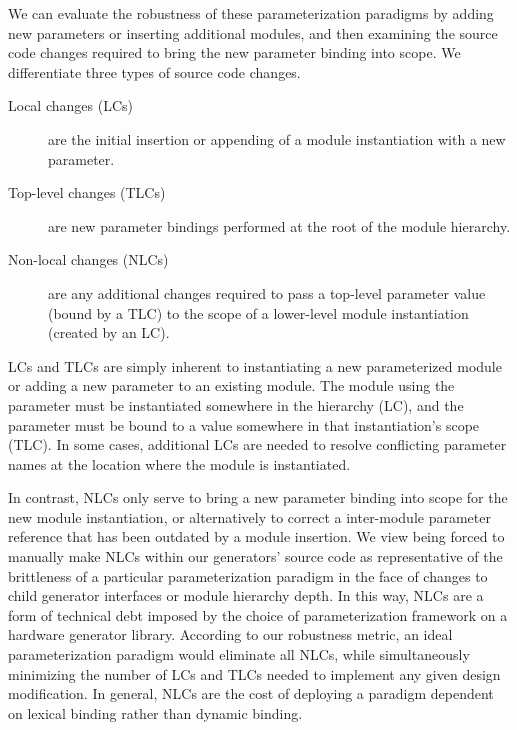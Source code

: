 We can evaluate the robustness of these parameterization paradigms by adding new parameters or inserting additional modules, and then examining the source code changes required to bring the new parameter binding into scope. 
We differentiate three types of source code changes.

\begin{description}
\item[Local changes (LCs)] are the initial insertion or appending of a module instantiation with a new parameter. 
\item[Top-level changes (TLCs)] are new parameter bindings performed at the root of the module hierarchy. 
\item[Non-local changes (NLCs)] are any additional changes required to pass a top-level parameter value (bound by a TLC) to the scope of a lower-level module instantiation (created by an LC). 
\end{description}

LCs and TLCs are simply inherent to instantiating a new parameterized module or adding a new parameter to an existing module.
The module using the parameter must be instantiated somewhere in the hierarchy (LC), and the parameter must be bound to a value
somewhere in that instantiation's scope (TLC).
In some cases, additional LCs are needed to resolve conflicting parameter names at the location where the module is instantiated.

In contrast, NLCs only serve to bring a new parameter binding into scope for the new module instantiation,
or alternatively to correct a inter-module parameter reference that has been outdated by a module insertion.
We view being forced to manually make NLCs within our generators' source code as representative of
the brittleness of a particular parameterization paradigm in the face of changes to child generator interfaces
or module hierarchy depth.
In this way, NLCs are a form of technical debt imposed by the choice of parameterization framework on a hardware generator library.
According to our robustness metric, an ideal parameterization paradigm would eliminate all NLCs,
while simultaneously minimizing the number of LCs and TLCs needed to implement any given design modification.
In general, NLCs are the cost of deploying a paradigm dependent on lexical binding rather than dynamic binding.


